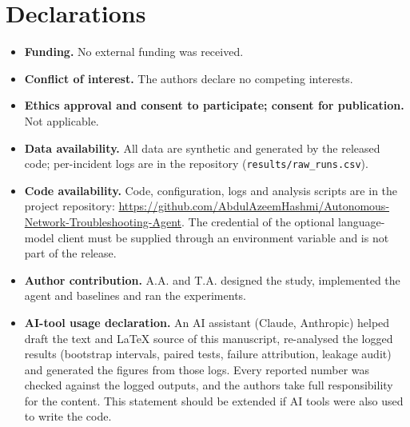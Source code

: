 \documentclass[pdflatex,sn-basic,Numbered,iicol]{sn-jnl}
\begin{document}
\section*{Declarations}
\begin{itemize}
\item \textbf{Funding.} No external funding was received.
\item \textbf{Conflict of interest.} The authors declare no competing interests.
\item \textbf{Ethics approval and consent to participate; consent for publication.} Not applicable.
\item \textbf{Data availability.} All data are synthetic and generated by the released code; per-incident logs are in the repository (\texttt{results/raw\_runs.csv}).
\item \textbf{Code availability.} Code, configuration, logs and analysis scripts are in the project repository: \url{https://github.com/AbdulAzeemHashmi/Autonomous-Network-Troubleshooting-Agent}. The credential of the optional language-model client must be supplied through an environment variable and is not part of the release.
\item \textbf{Author contribution.} A.A. and T.A. designed the study, implemented the agent and baselines and ran the experiments.
\item \textbf{AI-tool usage declaration.} An AI assistant (Claude, Anthropic) helped draft the text and LaTeX source of this manuscript, re-analysed the logged results (bootstrap intervals, paired tests, failure attribution, leakage audit) and generated the figures from those logs. Every reported number was checked against the logged outputs, and the authors take full responsibility for the content. This statement should be extended if AI tools were also used to write the code.
\end{itemize}
\end{document}
